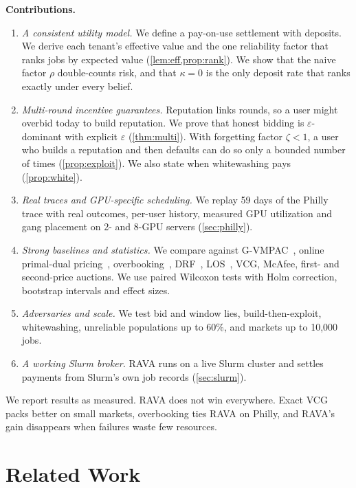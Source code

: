 \documentclass[journal]{IEEEtran}
\theoremstyle{remark}
\begin{document}
\textbf{Contributions.}
\begin{enumerate}
\item \emph{A consistent utility model.} We define a pay-on-use settlement with deposits. We derive each tenant's effective value and the one reliability factor that ranks jobs by expected value (\cref{lem:eff,prop:rank}). We show that the naive factor $\rho$ double-counts risk, and that $\kappa=0$ is the only deposit rate that ranks exactly under every belief.
\item \emph{Multi-round incentive guarantees.} Reputation links rounds, so a user might overbid today to build reputation. We prove that honest bidding is $\varepsilon$-dominant with explicit $\varepsilon$ (\cref{thm:multi}). With forgetting factor $\zeta<1$, a user who builds a reputation and then defaults can do so only a bounded number of times (\cref{prop:exploit}). We also state when whitewashing pays (\cref{prop:white}).
\item \emph{Real traces and GPU-specific scheduling.} We replay 59 days of the Philly trace with real outcomes, per-user history, measured GPU utilization and gang placement on 2- and 8-GPU servers (\cref{sec:philly}).
\item \emph{Strong baselines and statistics.} We compare against G-VMPAC~\cite{nejad2015}, online primal-dual pricing~\cite{zhang2017ton}, overbooking~\cite{qi2025ohtrust}, DRF~\cite{ghodsi2011}, LOS~\cite{lehmann2002}, VCG, McAfee, first- and second-price auctions. We use paired Wilcoxon tests with Holm correction, bootstrap intervals and effect sizes.
\item \emph{Adversaries and scale.} We test bid and window lies, build-then-exploit, whitewashing, unreliable populations up to 60\%, and markets up to 10{,}000 jobs.
\item \emph{A working Slurm broker.} RAVA runs on a live Slurm cluster and settles payments from Slurm's own job records (\cref{sec:slurm}).
\end{enumerate}

We report results as measured. RAVA does not win everywhere. Exact VCG packs better on small markets, overbooking ties RAVA on Philly, and RAVA's gain disappears when failures waste few resources.

\section{Related Work}\label{sec:related}
\end{document}
